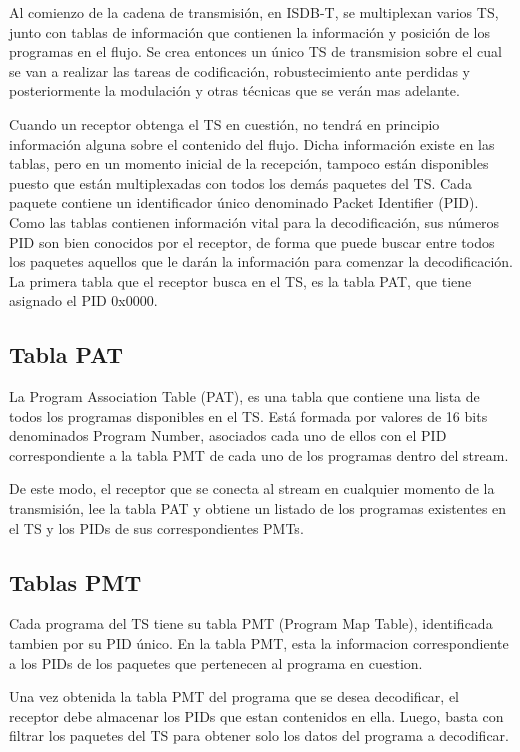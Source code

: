 	Al comienzo de la cadena de transmisión, en ISDB-T, se multiplexan varios TS, junto con tablas de información que contienen la información y posición de los programas en el flujo. Se crea entonces un único TS de transmision sobre el cual se van a realizar las tareas de codificación, robustecimiento ante perdidas y posteriormente la modulación y otras técnicas que se verán mas adelante.
	
	Cuando un receptor obtenga el TS en cuestión, no tendrá en principio información alguna sobre el contenido del flujo. Dicha información existe en las tablas, pero en un momento inicial de la recepción, tampoco están disponibles puesto que están multiplexadas con todos los demás paquetes del TS. Cada paquete contiene un identificador único denominado Packet Identifier (PID). Como las tablas contienen información vital para la decodificación, sus números PID son bien conocidos por el receptor, de forma que puede buscar entre todos los paquetes aquellos que le darán la información para comenzar la decodificación. La primera tabla que el receptor busca en el TS, es la tabla PAT, que tiene asignado el PID 0x0000. 
	
	\subsection{Tabla PAT}
	La Program Association Table (PAT), es una tabla que contiene una lista de todos los programas disponibles en el TS. Está formada por valores de 16 bits denominados Program Number, asociados cada uno de ellos con el PID correspondiente a la tabla PMT de cada uno de los programas dentro del stream. 
	
	De este modo, el receptor que se conecta al stream en cualquier momento de la transmisión, lee la tabla PAT y obtiene un listado de los programas existentes en el TS y los PIDs de sus correspondientes PMTs. 

	\subsection{Tablas PMT}

	Cada programa del TS tiene su tabla PMT (Program Map Table), identificada tambien por su PID único. En la tabla PMT, esta la informacion correspondiente a los PIDs de los paquetes que pertenecen al programa en cuestion.
	
	Una vez obtenida la tabla PMT del programa que se desea decodificar, el receptor debe almacenar los PIDs que estan contenidos en ella. Luego, basta con filtrar los paquetes del TS para obtener solo los datos del programa a decodificar. 
		
